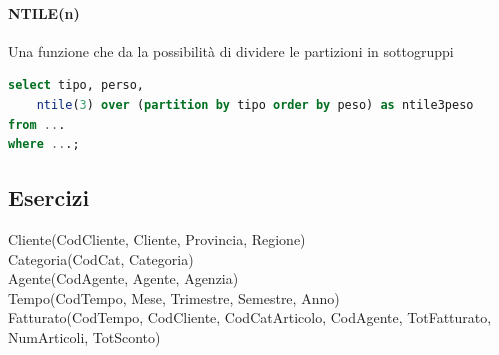 \documentclass[12pt]{article}
\begin{document}
\paragraph{NTILE(n)}
Una funzione che da la possibilit\`a di dividere le partizioni in sottogruppi
\begin{lstlisting}[language=sql]
select tipo, perso, 
    ntile(3) over (partition by tipo order by peso) as ntile3peso
from ...
where ...;
\end{lstlisting}



\subsection{Esercizi}
Cliente(CodCliente, Cliente, Provincia, Regione) \\
Categoria(CodCat, Categoria) \\
Agente(CodAgente, Agente, Agenzia) \\
Tempo(CodTempo, Mese, Trimestre, Semestre, Anno) \\
Fatturato(CodTempo, CodCliente, CodCatArticolo, CodAgente, TotFatturato, NumArticoli, TotSconto) 

\vspace{.8cm}
\end{document}
